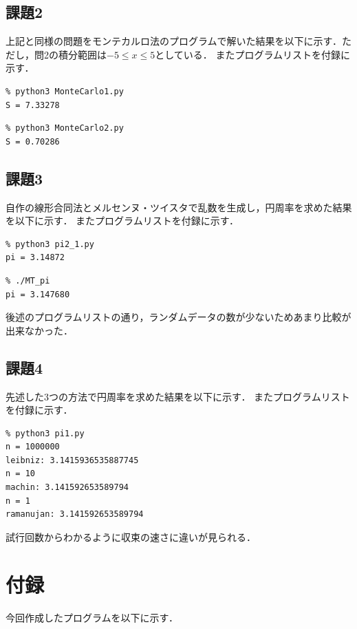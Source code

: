 \documentclass[a4paper, titlepage]{jsarticle}
\begin{document}
	\subsection{課題2}
	上記と同様の問題をモンテカルロ法のプログラムで解いた結果を以下に示す．ただし，問2の積分範囲は$-5 {\leq} x {\leq} 5$としている．
	またプログラムリストを付録に示す．
		\begin{lstlisting}
% python3 MonteCarlo1.py
S = 7.33278
		\end{lstlisting}
		\begin{lstlisting}
% python3 MonteCarlo2.py
S = 0.70286
		\end{lstlisting}

	\subsection{課題3}
	自作の線形合同法とメルセンヌ・ツイスタで乱数を生成し，円周率を求めた結果を以下に示す．
	またプログラムリストを付録に示す．
		\begin{lstlisting}
% python3 pi2_1.py
pi = 3.14872
		\end{lstlisting}
		\begin{lstlisting}
% ./MT_pi
pi = 3.147680
		\end{lstlisting}
	後述のプログラムリストの通り，ランダムデータの数が少ないためあまり比較が出来なかった．

	\subsection{課題4}
	先述した3つの方法で円周率を求めた結果を以下に示す．
	またプログラムリストを付録に示す．
		\begin{lstlisting}
% python3 pi1.py
n = 1000000
leibniz: 3.1415936535887745
n = 10
machin: 3.141592653589794
n = 1
ramanujan: 3.141592653589794
		\end{lstlisting}
	試行回数からわかるように収束の速さに違いが見られる．

	\section{付録}
	今回作成したプログラムを以下に示す．
\end{document}
